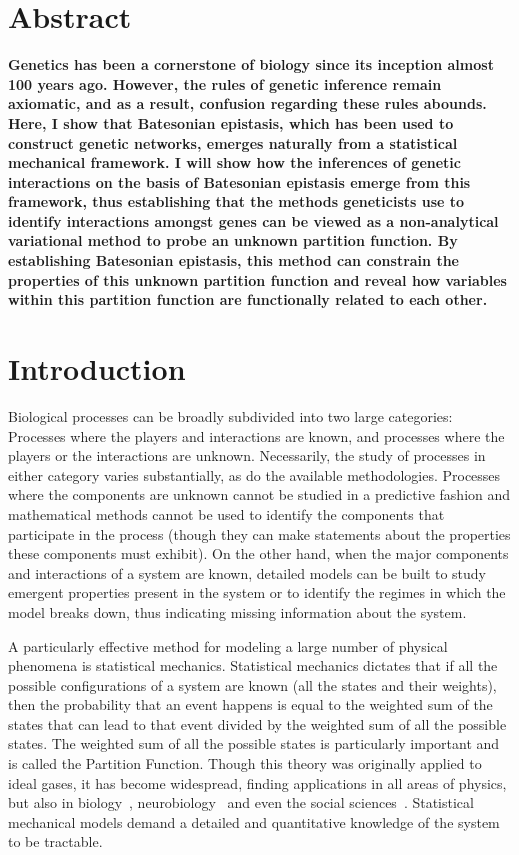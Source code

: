 
\newcommand{\Freg}{\( F_{reg} \)}


\section*{Abstract}
\textbf{Genetics has been a cornerstone of biology since its inception almost
100 years ago. However, the rules of genetic inference remain
axiomatic, and as a result, confusion regarding these rules abounds. Here, I
show that Batesonian epistasis, which has been used to construct genetic
networks, emerges naturally from a statistical mechanical framework. I will show
how the inferences of genetic interactions on the basis of Batesonian epistasis
emerge from this framework, thus establishing that the methods geneticists use
to identify interactions amongst genes can be viewed as a non-analytical
variational method to probe an unknown partition function. By establishing
Batesonian epistasis, this method can constrain the properties of this unknown
partition function and reveal how variables within this partition function are
functionally related to each other.
}

\section*{Introduction}
Biological processes can be broadly subdivided into two large categories:
Processes where the players and interactions are known, and processes where the
players or the interactions are unknown. Necessarily, the study of processes in
either category varies substantially, as do the available methodologies.
Processes where the components are unknown cannot be studied in a predictive
fashion and mathematical methods cannot be used to identify the components that
participate in the process (though they can make statements about the properties
these components must exhibit). On the other hand, when the major components and
interactions of a system are known, detailed models can be built to study
emergent properties present in the system or to identify the regimes in which
the model breaks down, thus indicating missing information about the system.

A particularly effective method for modeling a large number of physical
phenomena is statistical mechanics. Statistical mechanics dictates that if all
the possible configurations of a system are known (all the states and their
weights), then the probability that an event happens is equal to the weighted
sum of the states that can lead to that event divided by the weighted sum of all
the possible states. The weighted sum of all the possible states is particularly
important and is called the Partition Function. Though this theory was
originally applied to ideal gases, it has become widespread, finding
applications in all areas of physics, but also in biology~\citep{Garcia2007},
neurobiology~\citep{Schneidman2006} and even the social
sciences~\citep{Lee2015}. Statistical mechanical models demand a detailed and
quantitative knowledge of the system to be tractable.

